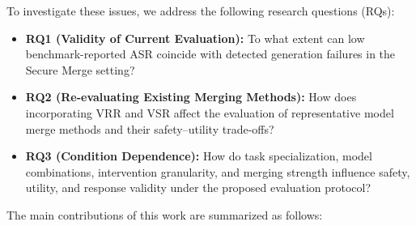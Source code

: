 \documentclass{article}
\begin{document}
To investigate these issues, we address the following research questions (RQs):

\begin{itemize}
    \item \textbf{RQ1 (Validity of Current Evaluation):} To what extent can low benchmark-reported ASR coincide with detected generation failures in the Secure Merge setting?
    
    \item \textbf{RQ2 (Re-evaluating Existing Merging Methods):} How does incorporating VRR and VSR affect the evaluation of representative model merge methods and their safety--utility trade-offs?
    
    \item \textbf{RQ3 (Condition Dependence):} How do task specialization, model combinations, intervention granularity, and merging strength influence safety, utility, and response validity under the proposed evaluation protocol?
\end{itemize}

The main contributions of this work are summarized as follows:
\end{document}
